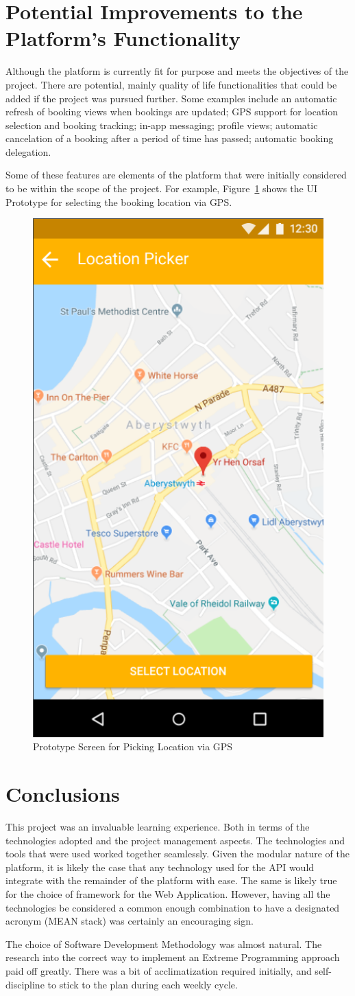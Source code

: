 \section{Potential Improvements to the Platform's Functionality}
Although the platform is currently fit for purpose and meets the objectives of the project. There are potential, mainly quality of life functionalities that could be added if the project was pursued further. Some examples include an automatic refresh of booking views when bookings are updated; GPS support for location selection and booking tracking; in-app messaging; profile views; automatic cancelation of a booking after a period of time has passed; automatic booking delegation.

Some of these features are elements of the platform that were initially considered to be within the scope of the project. For example, Figure~\ref{fig:location_picker} shows the UI Prototype for selecting the booking location via GPS.

\begin{figure}[!htb]
	\centering
	\includegraphics[width=0.5\linewidth]{Resources/img/location_picker_prototype.png}
	\caption{Prototype Screen for Picking Location via GPS}
	\label{fig:location_picker}
\end{figure}


\section{Conclusions}
This project was an invaluable learning experience. Both in terms of the technologies adopted and the project management aspects. The technologies and tools that were used worked together seamlessly. Given the modular nature of the platform, it is likely the case that any technology used for the API would integrate with the remainder of the platform with ease. The same is likely true for the choice of framework for the Web Application. However, having all the technologies be considered a common enough combination to have a designated acronym (MEAN stack) was certainly an encouraging sign.

The choice of Software Development Methodology was almost natural. The research into the correct way to implement an Extreme Programming approach paid off greatly. There was a bit of acclimatization required initially, and self-discipline to stick to the plan during each weekly cycle.